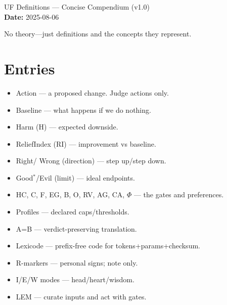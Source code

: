 \documentclass[11pt]{article}
\begin{document}
\begin{center}
{\LARGE UF Definitions — Concise Compendium (v1.0)}\\[6pt]
\textbf{Date: }2025-08-06
\end{center}

\noindent No theory—just definitions and the concepts they represent.

\section*{Entries}
\begin{itemize}
\item Action — a proposed change. Judge actions only.
\item Baseline — what happens if we do nothing.
\item Harm (H) — expected downside.
\item ReliefIndex (RI) — improvement vs baseline.
\item Right/ Wrong (direction) — step up/step down.
\item Good$^\ast$/Evil (limit) — ideal endpoints.
\item HC, C, F, EG, B, O, RV, AG, CA, $\Phi$ — the gates and preferences.
\item Profiles — declared caps/thresholds.
\item A=B — verdict-preserving translation.
\item Lexicode — prefix-free code for tokens+params+checksum.
\item R-markers — personal signs; note only.
\item I/E/W modes — head/heart/wisdom.
\item LEM — curate inputs and act with gates.
\end{itemize}
\end{document}
